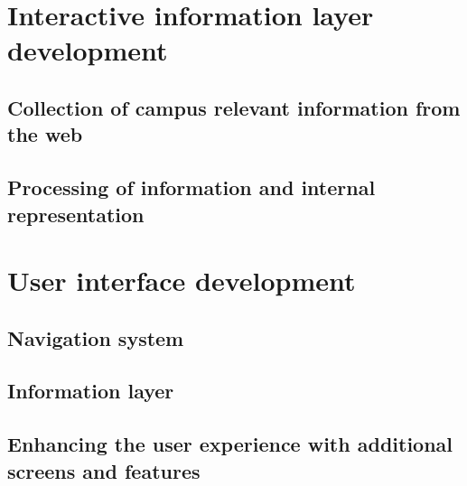 \section{Interactive information layer development}
\subsection{Collection of campus relevant information from the web}
\subsection{Processing of information and internal representation}

\section{User interface development}
\subsection{Navigation system}
\subsection{Information layer}
\subsection{Enhancing the user experience with additional screens and features}